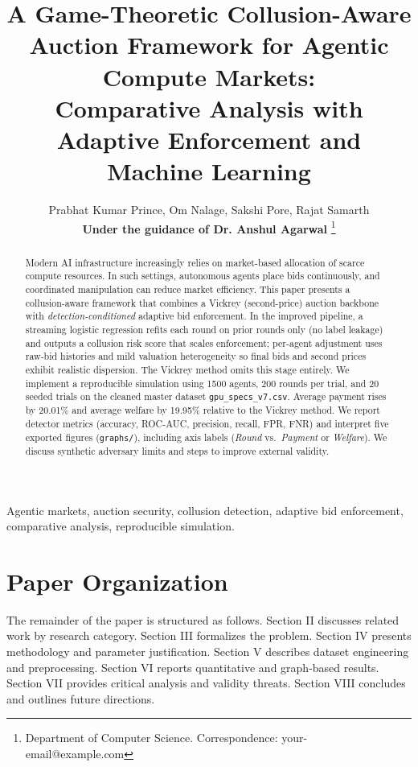 \documentclass[journal]{IEEEtran}
\title{A Game-Theoretic Collusion-Aware Auction Framework for Agentic Compute Markets:\\
Comparative Analysis with Adaptive Enforcement and Machine Learning}
\author{
Prabhat Kumar Prince,
Om Nalage,
Sakshi Pore,
Rajat Samarth\\
\textbf{Under the guidance of Dr. Anshul Agarwal}
\thanks{Department of Computer Science. Correspondence: your-email@example.com}
}
\begin{document}
\maketitle

\begin{abstract}
Modern AI infrastructure increasingly relies on market-based allocation of scarce compute resources. In such settings, autonomous agents place bids continuously, and coordinated manipulation can reduce market efficiency. This paper presents a collusion-aware framework that combines a Vickrey (second-price) auction backbone with \emph{detection-conditioned} adaptive bid enforcement. In the improved pipeline, a streaming logistic regression refits each round on prior rounds only (no label leakage) and outputs a collusion risk score that scales enforcement; per-agent adjustment uses raw-bid histories and mild valuation heterogeneity so final bids and second prices exhibit realistic dispersion. The Vickrey method omits this stage entirely. We implement a reproducible simulation using 1500 agents, 200 rounds per trial, and 20 seeded trials on the cleaned master dataset \texttt{gpu\_specs\_v7.csv}. Average payment rises by 20.01\% and average welfare by 19.95\% relative to the Vickrey method. We report detector metrics (accuracy, ROC-AUC, precision, recall, FPR, FNR) and interpret five exported figures (\texttt{graphs/}), including axis labels (\emph{Round} vs.\ \emph{Payment} or \emph{Welfare}). We discuss synthetic adversary limits and steps to improve external validity.
\end{abstract}

\begin{IEEEkeywords}
Agentic markets, auction security, collusion detection, adaptive bid enforcement, comparative analysis, reproducible simulation.
\end{IEEEkeywords}

\section{Paper Organization}
The remainder of the paper is structured as follows. Section II discusses related work by research category. Section III formalizes the problem. Section IV presents methodology and parameter justification. Section V describes dataset engineering and preprocessing. Section VI reports quantitative and graph-based results. Section VII provides critical analysis and validity threats. Section VIII concludes and outlines future directions.
\end{document}
